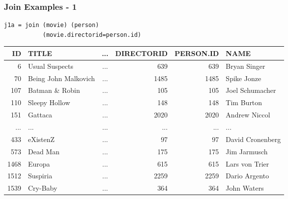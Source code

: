\documentclass[dvipsnames]{beamer}
\theoremstyle{plain}
\begin{document}
\begin{frame}[fragile]
  \frametitle{Join Examples - 1}

  \begin{example}
    \begin{lstlisting}
j1a = join (movie) (person)
           (movie.directorid=person.id)
    \end{lstlisting}

    \pause
    \begin{tiny}
    \begin{table}
      \begin{tabular}{|r|l|c|r|r|l|}\hline
  ID & TITLE                & ... & DIRECTORID & PERSON.ID & NAME            \\\hline\hline
   6 & Usual Suspects       & ... &        639 &       639 & Bryan Singer    \\\hline
  70 & Being John Malkovich & ... &       1485 &      1485 & Spike Jonze     \\\hline
 107 & Batman \& Robin      & ... &        105 &       105 & Joel Schumacher \\\hline
 110 & Sleepy Hollow        & ... &        148 &       148 & Tim Burton      \\\hline
 151 & Gattaca              & ... &       2020 &      2020 & Andrew Niccol   \\\hline
 ... & ...                  & ... &        ... &       ... & ...             \\\hline
 433 & eXistenZ             & ... &         97 &        97 & David Cronenberg\\\hline
 573 & Dead Man             & ... &        175 &       175 & Jim Jarmusch    \\\hline
1468 & Europa               & ... &        615 &       615 & Lars von Trier  \\\hline
1512 & Suspiria             & ... &       2259 &      2259 & Dario Argento   \\\hline
1539 & Cry-Baby             & ... &        364 &       364 & John Waters     \\\hline
      \end{tabular}
    \end{table}
    \end{tiny}
  \end{example}
\end{frame}
\end{document}

